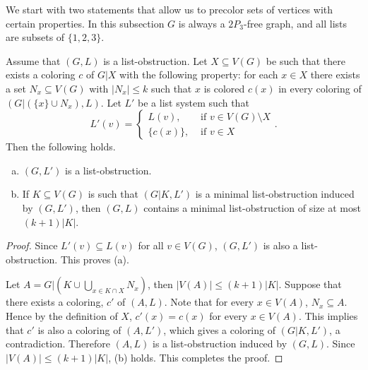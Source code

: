 \documentclass[11pt]{article}
\begin{document}
We start with two statements that allow us to precolor sets of vertices with certain properties. In this subsection $G$ is always a $2P_3$-free graph, and all lists are subsets of $\{1,2,3\}$.

\begin{claim}\label{color}
Assume that $(G,L)$ is a list-obstruction. Let $X\subseteq V(G)$ be such that there exists a coloring $c$ of $G|X$ with the following property: for each $x\in X$ there exists a set $N_x\subseteq V(G)$ with $|N_x|\leq k$ such that $x$ is colored $c(x)$ in every coloring of $(G|(\{x\}\cup N_x),L)$. 
Let $L'$ be a list system such that 
\begin{equation*} 
L'(v)=
\begin{cases}
L(v), & \mbox{ if } v\in V(G) \setminus X\\
\{c(x)\}, & \mbox{ if } v\in X
\end{cases}.
\end{equation*}
Then the following holds.
	\begin{enumerate}[(a)]
		\item $(G,L')$ is a list-obstruction.
		\item If $K\subseteq V(G)$ is such that $(G|K,L')$ is a minimal list-obstruction induced by $(G,L')$, then $(G,L)$ contains a minimal list-obstruction of size at most $(k+1)|K|$.
	\end{enumerate}
\end{claim}
\begin{proof}
	Since $L'(v)\subseteq L(v)$ for all $v \in V(G)$, $(G,L')$ is also a list-obstruction. This proves (a). 
	
Let $A=G|(K\cup \bigcup\limits_{x\in K\cap X}N_x)$, then $|V(A)|\leq (k+1)|K|$.  
Suppose that there exists a coloring, $c'$ of  $(A,L)$.
Note that for every $x\in V(A)$, $N_x\subseteq A$. Hence by the definition of $X$, $c'(x)=c(x)$ for every $x\in V(A)$. This implies that $c'$ is also a coloring of $(A,L')$, which gives a coloring of $(G|K,L')$, a contradiction. Therefore $(A,L)$ is a list-obstruction induced by $(G,L)$. Since $|V(A)|\leq (k+1)|K|$, (b) holds. This completes the proof. 
\end{proof}
\end{document}
